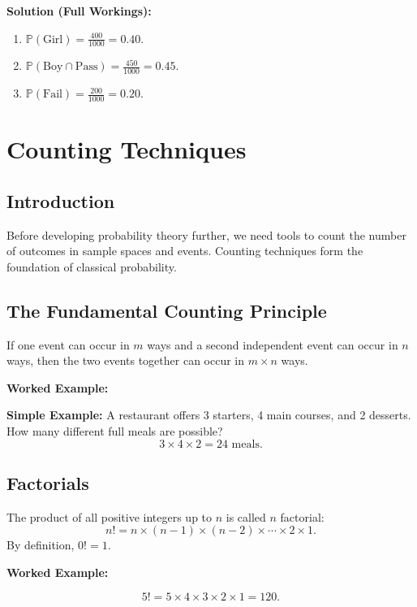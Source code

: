 \documentclass[12pt,a4paper,oneside]{report}
\theoremstyle{mytheorem}
\theoremstyle{mydefinition}
\theoremstyle{myremark}
\newenvironment{solution}{%
  \par\noindent\textbf{\color{mygreen}Solution (Full Workings):}\par\smallskip
}{%
  \par\bigskip
}
\newenvironment{worked}{%
  \par\medskip\noindent\textbf{\color{myorange}Worked Example:}\par\smallskip
}{%
  \par\medskip
}
\newcommand{\Prob}{\mathbb{P}}
\begin{document}
\begin{solution}
\begin{enumerate}[label=(\alph*)]
    \item $\Prob(\text{Girl}) = \frac{400}{1000} = 0.40$.
    \item $\Prob(\text{Boy} \cap \text{Pass}) = \frac{450}{1000} = 0.45$.
    \item $\Prob(\text{Fail}) = \frac{200}{1000} = 0.20$.
\end{enumerate}
\end{solution}

\chapter{Counting Techniques}

\section{Introduction}
Before developing probability theory further, we need tools to count the number of outcomes in sample spaces and events. Counting techniques form the foundation of classical probability.

\section{The Fundamental Counting Principle}
If one event can occur in $m$ ways and a second independent event can occur in $n$ ways, then the two events together can occur in $m \times n$ ways.

\begin{worked}
\textbf{Simple Example:}
A restaurant offers 3 starters, 4 main courses, and 2 desserts. How many different full meals are possible?
\[
3 \times 4 \times 2 = 24 \text{ meals}.
\]
\end{worked}

\section{Factorials}
The product of all positive integers up to $n$ is called $n$ factorial:
\[
n! = n \times (n-1) \times (n-2) \times \cdots \times 2 \times 1.
\]
By definition, $0! = 1$.

\begin{worked}
\[
5! = 5 \times 4 \times 3 \times 2 \times 1 = 120.
\]
\end{worked}
\end{document}
